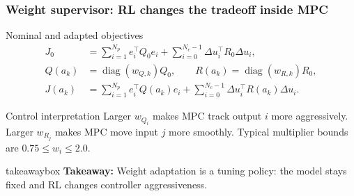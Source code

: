 \documentclass[aspectratio=169]{beamer}
\newcommand{\diag}{\operatorname{diag}}
\newcommand{\takeawaybox}[1]{%
\vspace{0.02cm}
\begin{center}
\begin{beamercolorbox}[wd=0.94\textwidth,sep=3pt,center,rounded=true,shadow=false]{takeawaybox}
\scriptsize
\textbf{\textcolor{maroon1}{Takeaway:}} #1
\end{beamercolorbox}
\end{center}
}
\begin{document}
\begin{frame}
\frametitle{\large \textbf{Weight supervisor: RL changes the tradeoff inside MPC}}
\scriptsize

\begin{block}{Nominal and adapted objectives}
\vspace{-0.1cm}
\begin{align*}
J_0 &= \sum_{i=1}^{N_p} e_i^\top Q_0 e_i
+\sum_{i=0}^{N_c-1}\Delta u_i^\top R_0\Delta u_i,\\
Q(a_k) &= \diag(w_{Q,k})Q_0,\qquad
R(a_k)=\diag(w_{R,k})R_0,\\
J(a_k)&=\sum_{i=1}^{N_p} e_i^\top Q(a_k)e_i
+\sum_{i=0}^{N_c-1}\Delta u_i^\top R(a_k)\Delta u_i.
\end{align*}
\vspace{-0.2cm}
\end{block}

\begin{block}{Control interpretation}
Larger \(w_{Q_i}\) makes MPC track output \(i\) more aggressively. Larger \(w_{R_j}\) makes MPC move input \(j\) more smoothly. Typical multiplier bounds are \(0.75\le w_i\le 2.0\).
\end{block}

\takeawaybox{Weight adaptation is a tuning policy: the model stays fixed and RL changes controller aggressiveness.}
\end{frame}
\end{document}
